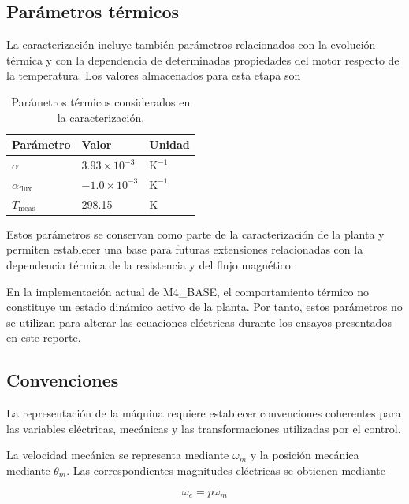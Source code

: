 \subsection{Parámetros térmicos}

La caracterización incluye también parámetros relacionados con la evolución térmica y con la dependencia de determinadas propiedades del motor respecto de la temperatura. Los valores almacenados para esta etapa son

\begin{table}[H]
\centering
\caption{Parámetros térmicos considerados en la caracterización.}
\label{tab:parametros-termicos-m4}
\begin{tabular}{lll}
\toprule
Parámetro & Valor & Unidad \\
\midrule
$\alpha$ & $3.93\times10^{-3}$ & $\mathrm{K^{-1}}$ \\
$\alpha_{\mathrm{flux}}$ & $-1.0\times10^{-3}$ & $\mathrm{K^{-1}}$ \\
$T_{\mathrm{meas}}$ & 298.15 & K \\
\bottomrule
\end{tabular}
\end{table}

Estos parámetros se conservan como parte de la caracterización de la planta y permiten establecer una base para futuras extensiones relacionadas con la dependencia térmica de la resistencia y del flujo magnético.

En la implementación actual de M4\_BASE, el comportamiento térmico no constituye un estado dinámico activo de la planta. Por tanto, estos parámetros no se utilizan para alterar las ecuaciones eléctricas durante los ensayos presentados en este reporte.

\subsection{Convenciones}

La representación de la máquina requiere establecer convenciones coherentes para las variables eléctricas, mecánicas y las transformaciones utilizadas por el control.

La velocidad mecánica se representa mediante $\omega_m$ y la posición mecánica mediante $\theta_m$. Las correspondientes magnitudes eléctricas se obtienen mediante

\begin{equation}
\omega_e=p\omega_m
\end{equation}

